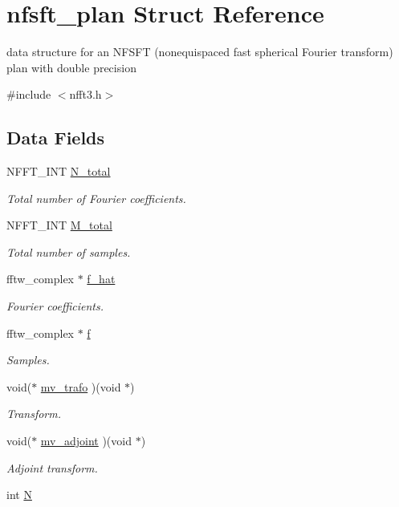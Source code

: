 \hypertarget{structnfsft__plan}{\section{nfsft\-\_\-plan Struct Reference}
\label{structnfsft__plan}
}


data structure for an N\-F\-S\-F\-T (nonequispaced fast spherical Fourier transform) plan with double precision  




{\ttfamily \#include $<$nfft3.\-h$>$}

\subsection*{Data Fields}
\begin{DoxyCompactItemize}
\item 
N\-F\-F\-T\-\_\-\-I\-N\-T \hyperlink{structnfsft__plan_a0a36dfca8351c262e37dbdd766b1ec52}{N\-\_\-total}
\begin{DoxyCompactList}\small\item\em Total number of Fourier coefficients. \end{DoxyCompactList}\item 
N\-F\-F\-T\-\_\-\-I\-N\-T \hyperlink{structnfsft__plan_a59e169c57df4a7e0aa1261293181bf49}{M\-\_\-total}
\begin{DoxyCompactList}\small\item\em Total number of samples. \end{DoxyCompactList}\item 
fftw\-\_\-complex $\ast$ \hyperlink{structnfsft__plan_af3f147694cf5d7ac7b658288bf2cfb42}{f\-\_\-hat}
\begin{DoxyCompactList}\small\item\em Fourier coefficients. \end{DoxyCompactList}\item 
fftw\-\_\-complex $\ast$ \hyperlink{structnfsft__plan_aebedb76f2df25603c548ae9672e970df}{f}
\begin{DoxyCompactList}\small\item\em Samples. \end{DoxyCompactList}\item 
void($\ast$ \hyperlink{structnfsft__plan_a01bf30c31f886ffa9d486c010a452051}{mv\-\_\-trafo} )(void $\ast$)
\begin{DoxyCompactList}\small\item\em Transform. \end{DoxyCompactList}\item 
void($\ast$ \hyperlink{structnfsft__plan_a14cc99f56f6a61958aef26f80aac6f12}{mv\-\_\-adjoint} )(void $\ast$)
\begin{DoxyCompactList}\small\item\em Adjoint transform. \end{DoxyCompactList}\item 
\hypertarget{structnfsft__plan_ae5da5c37169612dcf2d66ff595ee4403}{int \hyperlink{structnfsft__plan_ae5da5c37169612dcf2d66ff595ee4403}{N}}\label{structnfsft__plan_ae5da5c37169612dcf2d66ff595ee4403}


\end{DoxyCompactItemize}
